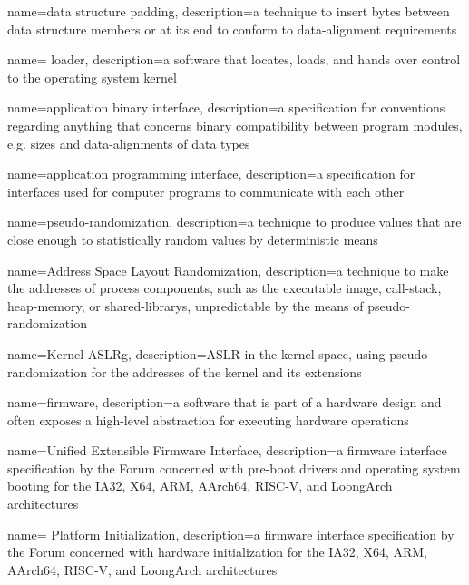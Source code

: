 {
  name={data structure padding},
  description={a technique to insert \glspl{byte} between data structure members or at its end to conform to \gls{data-alignment} requirements}
}

{
  name={ loader},
  description={a software that locates, loads, and hands over control to the operating system kernel}
}

{
  name={application binary interface},
  description={a specification for conventions regarding anything that concerns binary compatibility between program modules, e.g. sizes and \glspl{data-alignment} of data types}
}

{
  name={application programming interface},
  description={a specification for interfaces used for computer programs to communicate with each other}
}

{
  name={pseudo-randomization},
  description={a technique to produce values that are close enough to statistically random values by deterministic means}
}

{
  name={Address Space Layout Randomization},
  description={a technique to make the addresses of process components, such as the executable \gls{image}, \gls{call-stack}, \gls{heap-memory}, or \glspl{shared-library}, unpredictable by the means of \gls{pseudo-randomization}}
}

{
  name={Kernel \gls{ASLRg}},
  description={\gls{ASLR} in the \gls{kernel-space}, using \gls{pseudo-randomization} for the addresses of the kernel and its extensions}
}

{
  name={firmware},
  description={a software that is part of a hardware design and often exposes a high-level abstraction for executing hardware operations}
}

{
  name={Unified Extensible Firmware Interface},
  description={a \gls{firmware} interface specification by the  Forum concerned with pre-boot drivers and operating system booting for the IA32, X64, ARM, AArch64, RISC-V, and LoongArch  architectures}
}

{
  name={ Platform Initialization},
  description={a \gls{firmware} interface specification by the  Forum concerned with hardware initialization for the IA32, X64, ARM, AArch64, RISC-V, and LoongArch  architectures}
}

